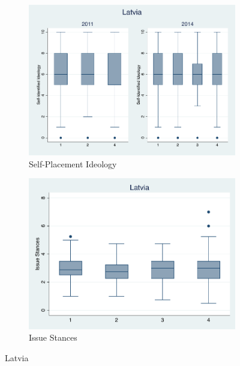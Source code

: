 \documentclass[12pt, titlepage]{article}
\begin{document}
\begin{figure}[H]
	\centering
	\begin{subfigure}[b]{0.475\textwidth}   
		\centering 
		\includegraphics[width=\textwidth]{IdeoBP/Latvia}
		\caption{Self-Placement Ideology}
	\end{subfigure}
	\hfill
	\begin{subfigure}[b]{0.475\textwidth}
		\centering 
		\includegraphics[width=\textwidth]{BoxLib/Latvia}
		\caption{Issue Stances}
	\end{subfigure}
	\caption{Latvia}
	\label{Latvia}
\end{figure}
\end{document}
